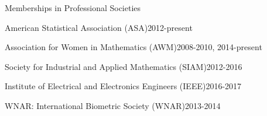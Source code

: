 \documentclass{resume} %
\begin{document}
\begin{rSection}{Memberships in Professional Societies}
\begin{esSubsection}{American Statistical Association }{(ASA)}{2012-present}{}{}
\end{esSubsection}

\begin{esSubsection}{Association for Women in Mathematics }{(AWM)}{2008-2010, 2014-present}{}{}
\end{esSubsection}

\begin{esSubsection}{Society for Industrial and Applied Mathematics }{(SIAM)}{2012-2016}{}{}
\end{esSubsection}


\begin{esSubsection}{Institute of Electrical and Electronics Engineers }{(IEEE)}{2016-2017}{}{}
\end{esSubsection}

\begin{esSubsection}{WNAR: International Biometric Society }{(WNAR)}{2013-2014}{}{}
\end{esSubsection}


\end{rSection}



\clearpage
\end{document}
